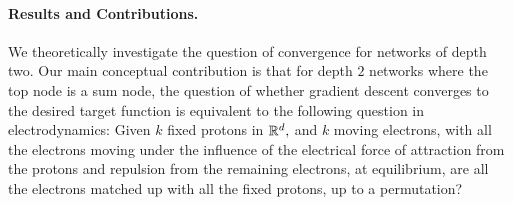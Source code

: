 


\paragraph{Results and Contributions.} 
We theoretically investigate the question of convergence for networks of depth two.
Our main conceptual contribution is that for depth $2$ networks where the top node is a sum node, the question of whether gradient descent converges to the desired target function is equivalent to the following question in electrodynamics: Given $k$ fixed protons in $\mathbb R^d,$ and $k$ moving electrons,
with all the electrons moving under the influence of the 
electrical force of attraction from the protons and repulsion from the remaining electrons,
at equilibrium, are all the electrons matched up with all the fixed protons, up to a permutation?  


